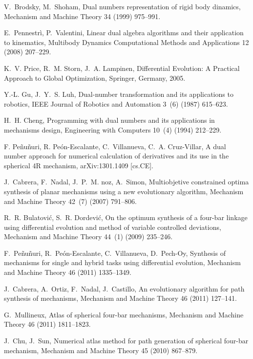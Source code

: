 \documentclass[11pt]{article}
\begin{document}
\begin{thebibliography}{10}
V.~Brodsky, M.~Shoham, Dual numbers representation of rigid body dinamics,
  Mechanism and Machine Theory 34 (1999) 975--991.

E.~Pennestr\`i, P.~Valentini, Linear dual algebra algorithms and their
  application to kinematics, Multibody Dynamics Computational Methods and
  Applications 12 (2008) 207--229.

K.~V. Price, R.~M. Storn, J.~A. Lampinen, Differential Evolution: A Practical
  Approach to Global Optimization, Springer, Germany, 2005.

Y.-L. Gu, J.~Y.~S. Luh, Dual-number transformation and its applications to
  robotics, IEEE Journal of Robotics and Automation 3~(6) (1987) 615--623.

H.~H. Cheng, Programming with dual numbers and its applications in mechanisms
  design, Engineering with Computers 10~(4) (1994) 212--229.

{F. Pe\~nu\~nuri}, {R. Pe\'on-Escalante}, C.~Villanueva, C.~A. Cruz-Villar, A
  dual number approach for numerical calculation of derivatives and its use in
  the spherical {4R} mechanism, arXiv:1301.1409 [cs.CE].

J.~Cabrera, F.~Nadal, J.~P.~M. noz, A.~Simon, Multiobjetive constrained optima
  synthesis of planar mechanisms using a new evolutionary algorithm, Mechanism
  and Machine Theory 42~(7) (2007) 791--806.

R.~R. Bulatovi\'c, S.~R. Dordevi\'c, On the optimum synthesis of a four-bar
  linkage using differential evolution and method of variable controlled
  deviations, Mechanism and Machine Theory 44~(1) (2009) 235--246.

F.~{Pe\~nu\~nuri}, R.~Pe\'on-Escalante, C.~Villanueva, D.~Pech-Oy, Synthesis of
  mechanisms for single and hybrid tasks using differential evolution,
  Mechanism and Machine Theory 46 (2011) 1335--1349.

J.~Cabrera, A.~Ortiz, F.~Nadal, J.~Castillo, An evolutionary algorithm for path
  synthesis of mechanisms, Mechanism and Machine Theory 46 (2011) 127--141.

G.~Mullineux, Atlas of spherical four-bar mechanisms, Mechanism and Machine
  Theory 46 (2011) 1811--1823.

J.~Chu, J.~Sun, Numerical atlas method for path generation of spherical
  four-bar mechanism, Mechanism and Machine Theory 45 (2010) 867--879.


\end{thebibliography}
\end{document}
